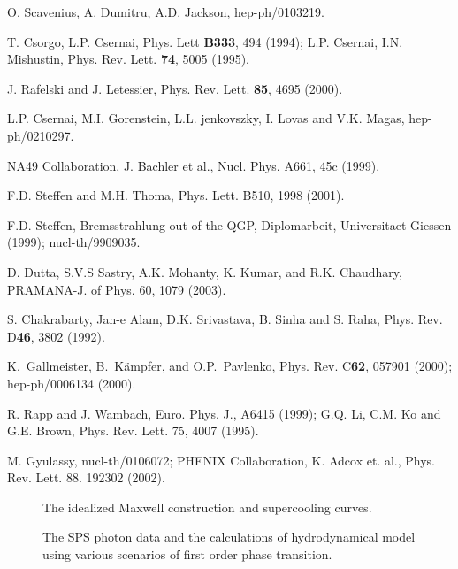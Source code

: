 \begin{thebibliography}{00}
 O. Scavenius, A. Dumitru, A.D. Jackson, 
          hep-ph/0103219.
          
 T. Csorgo, L.P. Csernai, Phys. Lett {\bf B333}, 494 (1994);
       L.P. Csernai, I.N. Mishustin, Phys. Rev. Lett. {\bf 74}, 5005 (1995).
       
 J. Rafelski and J. Letessier, Phys. Rev. Lett. {\bf 85},
                  4695 (2000).

 L.P. Csernai, M.I. Gorenstein, L.L. jenkovszky, 
                        I. Lovas and V.K. Magas, hep-ph/0210297.

 NA49 Collaboration, J. Bachler et al., Nucl. Phys. A661,
                45c (1999).

 F.D. Steffen and M.H. Thoma, Phys. Lett. B510, 
                  1998 (2001).

 F.D. Steffen, Bremsstrahlung out of the QGP,
                Diplomarbeit, Universitaet Giessen (1999); 
                nucl-th/9909035.

 D. Dutta, S.V.S Sastry, A.K. Mohanty, K. Kumar, and 
               R.K. Chaudhary, PRAMANA-J. of Phys. 60, 1079 (2003).

 S. Chakrabarty, Jan-e Alam, D.K. Srivastava, B. Sinha and 
              S. Raha, Phys. Rev. D{\bf 46}, 3802 (1992).
                  
 K.\ Gallmeister, B.\ K\"ampfer, and O.P.\ Pavlenko, 
            Phys. Rev. C{\bf 62}, 057901 (2000); hep-ph/0006134 (2000).

 R. Rapp and J. Wambach, Euro. Phys. J., A6415 (1999);
           G.Q. Li, C.M. Ko and G.E. Brown, Phys. Rev. Lett. 75,
           4007 (1995).

 M. Gyulassy, nucl-th/0106072; PHENIX Collaboration, 
           K. Adcox et. al., Phys. Rev. Lett. 88. 192302 (2002).

\end{thebibliography}


\begin{figure}[t]
\centerline{}
\caption{The idealized Maxwell construction and supercooling curves.}
\end{figure}

\begin{figure}[t]
\centerline{}
\caption{The SPS photon data and the calculations of hydrodynamical
model using various scenarios of first order phase transition.}
\end{figure}






